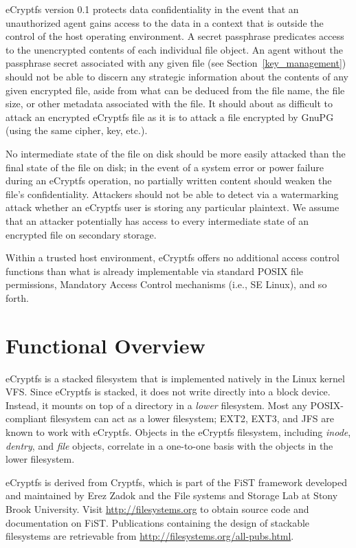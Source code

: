 \documentclass{article}
\begin{document}
eCryptfs version 0.1 protects data confidentiality in the event that
an unauthorized agent gains access to the data in a context that is
outside the control of the host operating environment. A secret
passphrase predicates access to the unencrypted contents of each
individual file object. An agent without the passphrase secret
associated with any given file (see Section~\ref{key_management})
should not be able to discern any strategic information about the
contents of any given encrypted file, aside from what can be deduced
from the file name, the file size, or other metadata associated with
the file. It should about as difficult to attack an encrypted eCryptfs
file as it is to attack a file encrypted by GnuPG (using the same
cipher, key, etc.).

No intermediate state of the file on disk should be more easily attacked
than the final state of the file on disk; in the event of a system error
or power failure during an eCryptfs operation, no partially written
content should weaken the file's confidentiality. Attackers should not
be able to detect via a watermarking attack whether an eCryptfs user is
storing any particular plaintext. We assume that an attacker potentially
has access to every intermediate state of an encrypted file on secondary
storage.

Within a trusted host environment, eCryptfs offers no additional
access control functions than what is already implementable via
standard POSIX file permissions, Mandatory Access Control mechanisms
(i.e., SE Linux), and so forth.

\section{Functional Overview}

eCryptfs is a stacked filesystem that is implemented natively in the
Linux kernel VFS. Since eCryptfs is stacked, it does not write
directly into a block device. Instead, it mounts on top of a directory
in a \emph{lower} filesystem. Most any POSIX-compliant filesystem can
act as a lower filesystem; EXT2, EXT3, and JFS are known to work with
eCryptfs. Objects in the eCryptfs filesystem, including \emph{inode},
\emph{dentry}, and \emph{file} objects, correlate in a one-to-one
basis with the objects in the lower filesystem.

eCryptfs is derived from Cryptfs, which is part of the FiST framework
developed and maintained by Erez Zadok and the File systems and
Storage Lab at Stony Brook University. Visit
\url{http://filesystems.org} to obtain source code and documentation
on FiST. Publications containing the design of stackable filesystems
are retrievable from \url{http://filesystems.org/all-pubs.html}.
\end{document}
